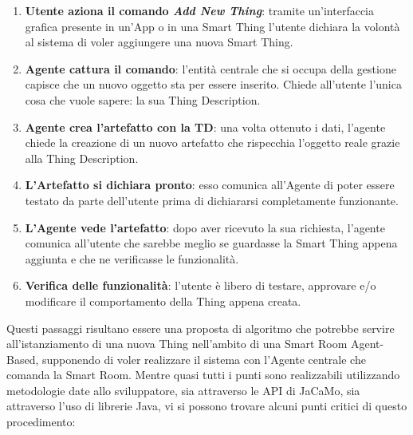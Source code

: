 \documentclass[12pt,a4paper,openright,oneside]{report}
\begin{document}
\begin{enumerate}
	\item \textbf{Utente aziona il comando \textit{Add New Thing}}: tramite un'interfaccia grafica presente in un'App o in una Smart Thing l'utente dichiara la volontà al sistema di voler aggiungere una nuova Smart Thing.
	
	\item \textbf{Agente cattura il comando}: l'entità centrale che si occupa della gestione capisce che un nuovo oggetto sta per essere inserito. Chiede all'utente l'unica cosa che vuole sapere: la sua Thing Description.
	
	\item \textbf{Agente crea l'artefatto con la TD}: una volta ottenuto i dati, l'agente chiede la creazione di un nuovo artefatto che rispecchia l'oggetto reale grazie alla Thing Description.
	
	\item \textbf{L'Artefatto si dichiara pronto}: esso comunica all'Agente di poter essere testato da parte dell'utente prima di dichiararsi completamente funzionante.
	
	\item \textbf{L'Agente vede l'artefatto}: dopo aver ricevuto la sua richiesta, l'agente comunica all'utente che sarebbe meglio se guardasse la Smart Thing appena aggiunta e che ne verificasse le funzionalità.
	
	\item \textbf{Verifica delle funzionalità}: l'utente è libero di testare, approvare e/o modificare il comportamento della Thing appena creata.
\end{enumerate}

Questi passaggi risultano essere una proposta di algoritmo che potrebbe servire all'istanziamento di una nuova Thing nell'ambito di una Smart Room Agent-Based, supponendo di voler realizzare il sistema con l'Agente centrale che comanda la Smart Room. Mentre quasi tutti i punti sono realizzabili utilizzando metodologie date allo sviluppatore, sia attraverso le API di JaCaMo, sia attraverso l'uso di librerie Java, vi si possono trovare alcuni punti critici di questo procedimento:
\end{document}

